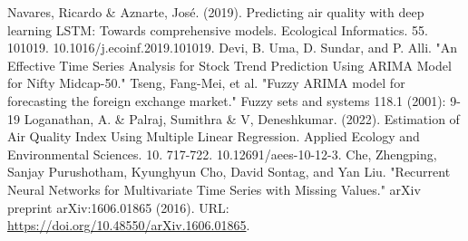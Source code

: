 \documentclass[conference]{IEEEtran}
\begin{document}
\begin{thebibliography}{00}
     Navares, Ricardo \& Aznarte, José. (2019). Predicting air quality with deep learning LSTM: Towards comprehensive models. Ecological Informatics. 55. 101019. 10.1016/j.ecoinf.2019.101019.
     Devi, B. Uma, D. Sundar, and P. Alli. "An Effective Time Series Analysis for Stock Trend Prediction Using ARIMA Model for Nifty Midcap-50."
     Tseng, Fang-Mei, et al. "Fuzzy ARIMA model for forecasting the foreign exchange market." Fuzzy sets and systems 118.1 (2001): 9-19
     Loganathan, A. \& Palraj, Sumithra \& V, Deneshkumar. (2022). Estimation of Air Quality Index Using Multiple Linear Regression. Applied Ecology and Environmental Sciences. 10. 717-722. 10.12691/aees-10-12-3.
    Che, Zhengping, Sanjay Purushotham, Kyunghyun Cho, David Sontag, and Yan Liu.
    "Recurrent Neural Networks for Multivariate Time Series with Missing Values."
    arXiv preprint arXiv:1606.01865 (2016).
    URL: \url{https://doi.org/10.48550/arXiv.1606.01865}.
\end{thebibliography}
\end{document}

